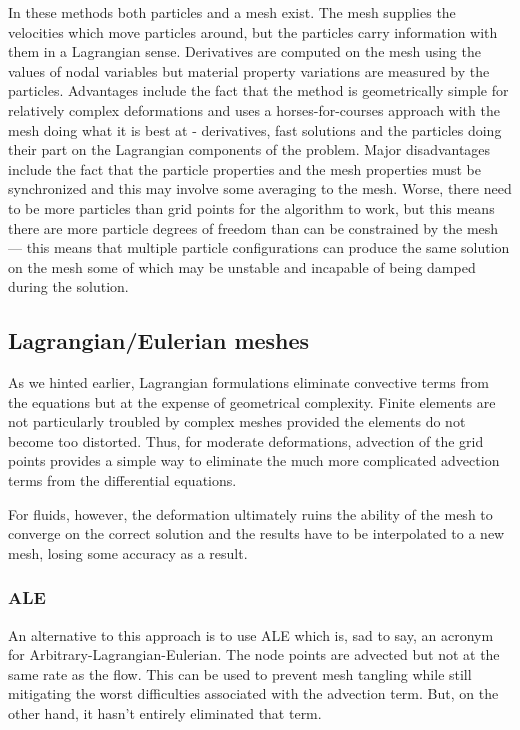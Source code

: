 \documentclass[10pt]{article}
\begin{document}
		In these methods both particles and a mesh exist. The mesh supplies 
		the velocities which move particles around, but the particles carry
		information with them in a Lagrangian sense. Derivatives are computed
		on the mesh using the values of nodal variables but material property variations
		are measured by the particles. Advantages include the fact that the method is
		geometrically simple for relatively complex deformations and uses a horses-for-courses
		approach with the mesh doing what it is best at - derivatives, fast solutions 
		and the particles doing their part on the Lagrangian components of the problem.
		Major disadvantages include the fact that the particle properties and the 
		mesh properties must be synchronized and this may involve some averaging to the mesh.
		Worse, there need to be more particles than grid points for the algorithm to
		work, but this means there are more particle degrees of freedom than can 
		be constrained by the mesh --- this means that multiple particle configurations
		can produce the same solution on the mesh some of which may be unstable 
		and incapable of being damped during the solution.
	
	\subsection{Lagrangian/Eulerian meshes}
	
		As we hinted earlier, Lagrangian formulations eliminate 
		convective terms from the equations but at the expense of geometrical
		complexity. Finite elements are not particularly troubled by complex meshes
		provided the elements do not become too distorted. Thus, for moderate
		deformations, advection of the grid points provides a simple way to eliminate
		the much more complicated advection terms from the differential equations.
		
		For fluids, however, the deformation ultimately ruins the ability of
		the mesh to converge on the correct solution and the results have
		to be interpolated to a new mesh, losing some accuracy as a result.
		
		\subsubsection{ALE}
			An alternative to this approach is to use ALE which is, sad to say, 
			an acronym for Arbitrary-Lagrangian-Eulerian. The node points are
			advected but not at the same rate as the flow. This can be used to prevent
			mesh tangling while still mitigating the worst difficulties associated with
			the advection term. But, on the other hand, it hasn't entirely eliminated
			that term.
	
\end{document}
